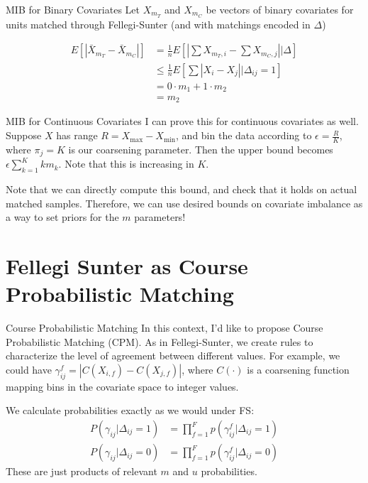 \documentclass{beamer}
\begin{document}
\begin{frame}{MIB for Binary Covariates}
	Let $X_{m_T}$ and $X_{m_C}$ be vectors of binary covariates for units matched through Fellegi-Sunter (and with matchings encoded in $\Delta$)
	
	\begin{align*}
		E[|\bar{X}_{m_T} - \bar{X}_{m_C}|] &= \frac{1}{n}E\left[|\sum{X}_{m_T, i} - \sum{X}_{m_C, j}|| \Delta\right] \\
		&\leq \frac{1}{n} E\left[\sum |X_i - X_j| | \Delta_{ij} = 1\right] \\
		&= 0 \cdot m_{1} + 1 \cdot m_{2} \\
		&=m_{2}
	\end{align*}
\end{frame}

\begin{frame}{MIB for Continuous Covariates}
	I can prove this for continuous covariates as well. Suppose $X$ has range $R = X_{\max} - X_{\min}$, and bin the data according to $\epsilon = \frac{R}{K}$, where $\pi_j = K$ is our coarsening parameter. Then the upper bound becomes $\epsilon \sum_{k=1}^K k m_k$. Note that this is increasing in $K$. \linebreak
	
	Note that we can directly compute this bound, and check that it holds on actual matched samples. Therefore, we can use desired bounds on covariate imbalance as a way to set priors for the $m$ parameters!
\end{frame}

\section{Fellegi Sunter as Course Probabilistic Matching}

\begin{frame}{Course Probabilistic Matching}
	In this context, I'd like to propose Course Probabilistic Matching (CPM). As in Fellegi-Sunter, we create rules to characterize the level of agreement between different values. For example, we could have $\gamma_{ij}^f = |C(X_{i, f}) - C(X_{j, f})|$, where $C(\cdot)$ is a coarsening function mapping bins in the covariate space to integer values. \linebreak
	
	We calculate probabilities exactly as we would under FS:
	\begin{align*}
		P(\gamma_{ij}| \Delta_{ij} = 1) &= \prod_{f=1}^F p(\gamma_{ij}^f|\Delta_{ij}= 1) \\
		P(\gamma_{ij}| \Delta_{ij} = 0) &= \prod_{f=1}^F p(\gamma_{ij}^f|\Delta_{ij}= 0)
	\end{align*}
These are just products of relevant $m$ and $u$ probabilities.
\end{frame}
\end{document}
